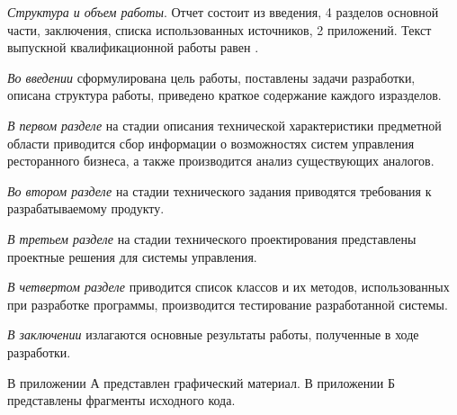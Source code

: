 \textit{Структура и объем работы}. Отчет состоит из введения, 4 разделов основной части, заключения, списка использованных источников, 2 приложений. Текст выпускной квалификационной работы равен .

\textit{Во введении} сформулирована цель работы, поставлены задачи разработки, описана структура работы, приведено краткое содержание каждого изразделов.

\textit{В первом разделе} на стадии описания технической характеристики предметной области приводится сбор информации о возможностях систем управления ресторанного бизнеса, а также производится анализ существующих аналогов.

\textit{Во втором разделе} на стадии технического задания приводятся требования к разрабатываемому продукту.

\textit{В третьем разделе} на стадии технического проектирования представлены проектные решения для системы управления.

\textit{В четвертом разделе} приводится список классов и их методов, использованных при разработке программы, производится тестирование разработанной системы.

\textit{В заключении} излагаются основные результаты работы, полученные в ходе разработки.

В приложении А представлен графический материал. В приложении Б представлены фрагменты исходного кода.